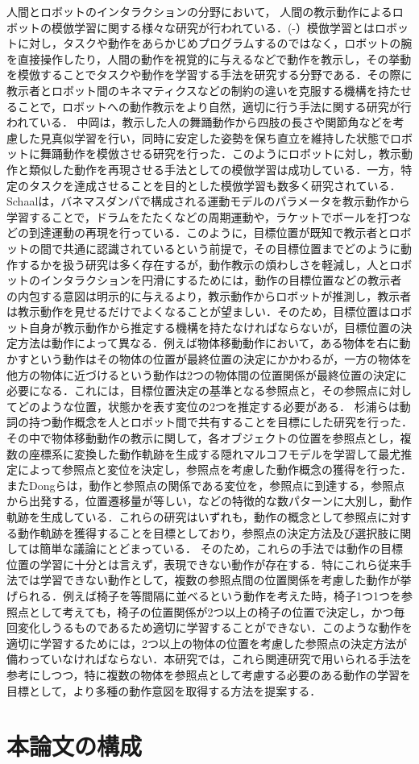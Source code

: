 人間とロボットのインタラクションの分野において，
人間の教示動作によるロボットの模倣学習に関する様々な研究が行われている．(\cite{imitation1}-\cite{imitation4}）模倣学習とはロボットに対し，タスクや動作をあらかじめプログラムするのではなく，ロボットの腕を直接操作したり，人間の動作を視覚的に与えるなどで動作を教示し，その挙動を模倣することでタスクや動作を学習する手法を研究する分野である．その際に教示者とロボット間のキネマティクスなどの制約の違いを克服する機構を持たせることで，ロボットへの動作教示をより自然，適切に行う手法に関する研究が行われている．
中岡\cite{nakaoka}は，教示した人の舞踊動作から四肢の長さや関節角などを考慮した見真似学習を行い，同時に安定した姿勢を保ち直立を維持した状態でロボットに舞踊動作を模倣させる研究を行った．このようにロボットに対し，教示動作と類似した動作を再現させる手法としての模倣学習は成功している．一方，特定のタスクを達成させることを目的とした模倣学習も数多く研究されている．
Schaal\cite{schaal}は，バネマスダンパで構成される運動モデルのパラメータを教示動作から学習することで，ドラムをたたくなどの周期運動や，ラケットでボールを打つなどの到達運動の再現を行っている．このように，目標位置が既知で教示者とロボットの間で共通に認識されているという前提で，その目標位置までどのように動作するかを扱う研究は多く存在するが，動作教示の煩わしさを軽減し，人とロボットのインタラクションを円滑にするためには，動作の目標位置などの教示者の内包する意図は明示的に与えるより，教示動作からロボットが推測し，教示者は教示動作を見せるだけでよくなることが望ましい．そのため，目標位置はロボット自身が教示動作から推定する機構を持たなければならないが，目標位置の決定方法は動作によって異なる．例えば物体移動動作において，ある物体を右に動かすという動作はその物体の位置が最終位置の決定にかかわるが，一方の物体を他方の物体に近づけるという動作は2つの物体間の位置関係が最終位置の決定に必要になる．これには，目標位置決定の基準となる参照点と，その参照点に対してどのような位置，状態かを表す変位の2つを推定する必要がある．
杉浦ら\cite{sugiura}は動詞の持つ動作概念を人とロボット間で共有することを目標にした研究を行った．その中で物体移動動作の教示に関して，各オブジェクトの位置を参照点とし，複数の座標系に変換した動作軌跡を生成する隠れマルコフモデルを学習して最尤推定によって参照点と変位を決定し，参照点を考慮した動作概念の獲得を行った．またDongら\cite{dong}は，動作と参照点の関係である変位を，参照点に到達する，参照点から出発する，位置遷移量が等しい，などの特徴的な数パターンに大別し，動作軌跡を生成している．これらの研究はいずれも，動作の概念として参照点に対する動作軌跡を獲得することを目標としており，参照点の決定方法及び選択肢に関しては簡単な議論にとどまっている．
そのため，これらの手法では動作の目標位置の学習に十分とは言えず，表現できない動作が存在する．特にこれら従来手法では学習できない動作として，複数の参照点間の位置関係を考慮した動作が挙げられる．例えば椅子を等間隔に並べるという動作を考えた時，椅子1つ1つを参照点として考えても，椅子の位置関係が2つ以上の椅子の位置で決定し，かつ毎回変化しうるものであるため適切に学習することができない．このような動作を適切に学習するためには，2つ以上の物体の位置を考慮した参照点の決定方法が備わっていなければならない．本研究では，これら関連研究で用いられる手法を参考にしつつ，特に複数の物体を参照点として考慮する必要のある動作の学習を目標として，より多種の動作意図を取得する方法を提案する．        

\section{本論文の構成}

